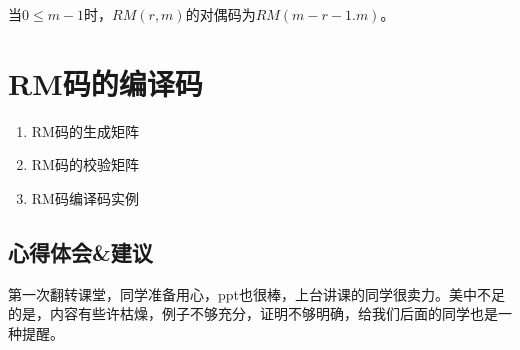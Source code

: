 \documentclass[onecolumn,oneside]{BUPTHomework}
\begin{document}
  当$0 \leq m-1$时，$RM(r,m)$的对偶码为$RM(m-r-1.m)$。

  \section*{RM码的编译码}

  \begin{enumerate}
    \item RM码的生成矩阵
    \item RM码的校验矩阵
    \item RM码编译码实例
  \end{enumerate}

  \subsection*{心得体会\&建议}

  第一次翻转课堂，同学准备用心，ppt也很棒，上台讲课的同学很卖力。美中不足的是，内容有些许枯燥，例子不够充分，证明不够明确，给我们后面的同学也是一种提醒。
\end{document}
